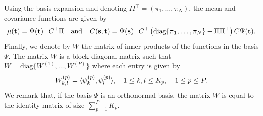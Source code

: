 Using the basis expansion and denoting $\Pi^\top = (\pi_1, \dots, \pi_N)$, the mean and covariance functions are given by
\begin{equation}
    \mu(\mathbf{t}) = \Psi(\mathbf{t})^\top C^\top\Pi \quad\text{and}\quad C(\mathbf{s}, \mathbf{t}) = \Psi(\mathbf{s})^\top C^\top \left(\text{diag}\{
        \pi_1, \dots, \pi_N\} - \Pi\Pi^\top\right)C \Psi(\mathbf{t}).
\end{equation}
Finally, we denote by $W$ the matrix of inner products of the functions in the basis $\Psi$. The matrix $W$ is a block-diagonal matrix such that $W = \text{diag}\{W^{(1)}, \dots, W^{(P)}\}$ where each entry is given by
\begin{equation}
    W_{k, l}^{(p)} = \langle\psi_k^{(p)}, \psi_l^{(p)}\rangle, \quad 1 \leq k, l \leq K_p, \quad 1 \leq p \leq P.
\end{equation}
We remark that, if the basis $\Psi$ is an orthonormal basis, the matrix $W$ is equal to the identity matrix of size $\sum_{p = 1}^P K_p$.

